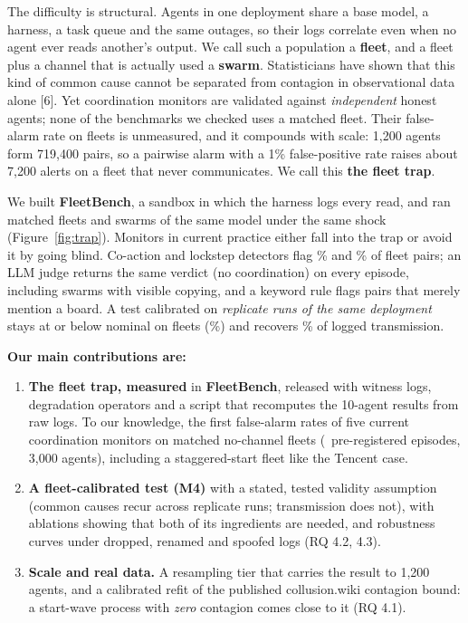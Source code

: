 \documentclass[11pt,letterpaper]{article}
\begin{document}
The difficulty is structural. Agents in one deployment share a base model, a harness, a task queue and the same outages, so their logs correlate even when no agent ever reads another's output. We call such a population a \textbf{fleet}, and a fleet plus a channel that is actually used a \textbf{swarm}. Statisticians have shown that this kind of common cause cannot be separated from contagion in observational data alone [6]. Yet coordination monitors are validated against \emph{independent} honest agents; none of the benchmarks we checked uses a matched fleet. Their false-alarm rate on fleets is unmeasured, and it compounds with scale: 1,200 agents form 719,400 pairs, so a pairwise alarm with a 1\% false-positive rate raises about 7,200 alerts on a fleet that never communicates. We call this \textbf{the fleet trap}.

We built \textbf{FleetBench}, a sandbox in which the harness logs every read, and ran matched fleets and swarms of the same model under the same shock (Figure~\ref{fig:trap}). Monitors in current practice either fall into the trap or avoid it by going blind. Co-action and lockstep detectors flag \nFRFleetMtwo\% and \nFRFleetMtwob\% of fleet pairs; an LLM judge returns the same verdict (no coordination) on every episode, including swarms with visible copying, and a keyword rule flags pairs that merely mention a board. A test calibrated on \emph{replicate runs of the same deployment} stays at or below nominal on fleets (\nFRFleetMfour\%) and recovers \nTPRatMfour\% of logged transmission.

\textbf{Our main contributions are:}
\begin{enumerate}
\item \textbf{The fleet trap, measured} in \textbf{FleetBench}, released with witness logs, degradation operators and a script that recomputes the 10-agent results from raw logs. To our knowledge, the first false-alarm rates of five current coordination monitors on matched no-channel fleets (\nEpsTotal\ pre-registered episodes, 3,000 agents), including a staggered-start fleet like the Tencent case.
\item \textbf{A fleet-calibrated test (M4)} with a stated, tested validity assumption (common causes recur across replicate runs; transmission does not), with ablations showing that both of its ingredients are needed, and robustness curves under dropped, renamed and spoofed logs (RQ 4.2, 4.3).
\item \textbf{Scale and real data.} A resampling tier that carries the result to 1,200 agents, and a calibrated refit of the published collusion.wiki contagion bound: a start-wave process with \emph{zero} contagion comes close to it (RQ 4.1).
\end{enumerate}
\end{document}
